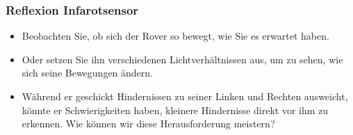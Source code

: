 \documentclass{vorlage-design-main}
\begin{document}
\hypertarget{reflexion-infarotsensor}{%
\subsubsection{Reflexion Infarotsensor}\label{reflexion-infarotsensor}}

\begin{itemize}
\item
  Beobachten Sie, ob sich der Rover so bewegt, wie Sie es erwartet
  haben.
\item
  Oder setzen Sie ihn verschiedenen Lichtverhältnissen aus, um zu sehen,
  wie sich seine Bewegungen ändern.
\item
  Während er geschickt Hindernissen zu seiner Linken und Rechten
  ausweicht, könnte er Schwierigkeiten haben, kleinere Hindernisse
  direkt vor ihm zu erkennen. Wie können wir diese Herausforderung
  meistern?
\end{itemize} %


\clearpage
\printbibliography
\end{document}
